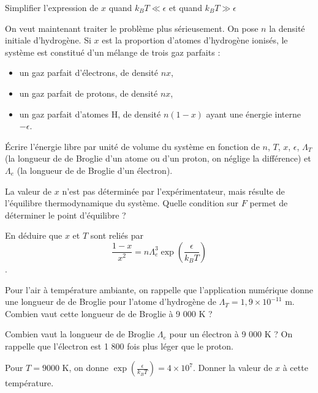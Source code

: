 \question Simplifier l’expression de $x$ quand $k_B T \ll \epsilon $ et quand $k_B T \gg \epsilon $


On veut maintenant traiter le problème plus sérieusement. On pose $n$ la densité initiale d’hydrogène. Si $x$ est la proportion d’atomes d’hydrogène ionisés, le système est constitué d’un mélange de trois gaz parfaits :
\begin{itemize}
    \item un gaz parfait d’électrons, de densité $nx$,
    \item un gaz parfait de protons, de densité $nx$,
    \item un gaz parfait d’atomes H, de densité $n(1 - x)$ ayant une énergie interne $-\epsilon$.
\end{itemize}


\question Écrire l’énergie libre par unité de volume du système en fonction de $n$, $T$, $x$, $\epsilon$, $\Lambda_T$ (la longueur de de Broglie d’un atome ou d’un proton, on néglige la différence) et  $\Lambda_e$ (la longueur de de Broglie d’un électron).

\question La valeur de $x$ n’est pas déterminée par l’expérimentateur, mais résulte de l’équilibre thermodynamique du système. Quelle condition sur $F$ permet de déterminer le point d’équilibre ?

\question  En déduire que $x$ et $T$ sont reliés par $$\frac{1-x}{x^2}=n\Lambda_e^3 \exp(\frac{\epsilon}{k_BT})$$.

\question Pour l’air à température ambiante, on rappelle que l’application numérique donne une longueur de de Broglie pour l'atome d'hydrogène de  $ \Lambda_T=1,9 \times 10^{-11}$ m. Combien vaut cette longueur de de Broglie à 9 000 K  ?

\question  Combien vaut la longueur de de Broglie $\Lambda_e$ pour un électron à 9 000 K ? On rappelle que l’électron est 1 800 fois plus léger que le proton.

\question Pour $T = 9 000$ K, on donne  $\exp(\frac{\epsilon}{k_BT})=4 \times 10^7$. Donner la valeur de $x$ à cette température.
